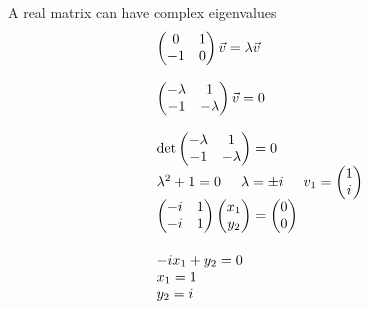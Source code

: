     A real matrix can have complex eigenvalues
    \begin{equation*}
    \begin{array}{l}
      \begin{pmatrix}
          0 & 1 \\
          -1 & 0
      \end{pmatrix}
      \Vec{v} = \lambda\Vec{v}\\
      \\
      \begin{pmatrix}
          -\lambda & 1 \\
          -1 & -\lambda
      \end{pmatrix}
      \Vec{v} =0\\
      \\
      \det
      \begin{pmatrix}
          -\lambda & 1 \\
          -1 & -\lambda
      \end{pmatrix}
      =0\\
      \lambda^2+1=0
      \hspace{0.5cm}
      \lambda = \pm i
      \hspace{0.5cm}
      v_{1}=
      \begin{pmatrix}
          1 \\
          i
      \end{pmatrix}\\
      \vspace{0.5cm}
      \begin{pmatrix}
          -i & 1 \\
          -i & 1 
      \end{pmatrix}
      \begin{pmatrix}
          x_{1} \\
          y_{2}
      \end{pmatrix}
      =
      \begin{pmatrix}
          0 \\
          0 
      \end{pmatrix}\\
      -ix_{1}+y_{2} =0\\
      x_{1} =1\\
      y_{2} =i
    \end{array}
    \end{equation*}
    
